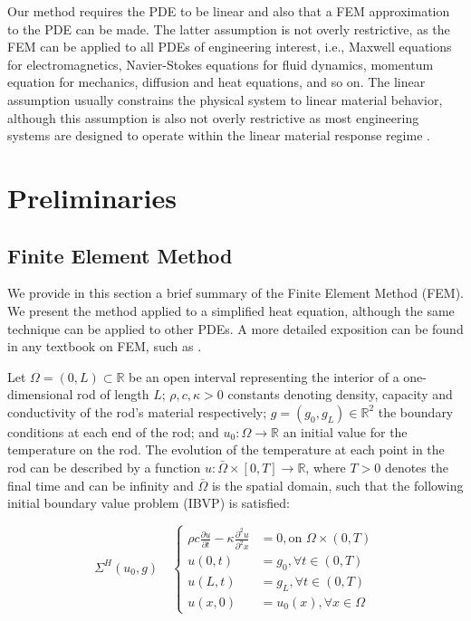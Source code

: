 \documentclass[letterpaper, 10 pt, conference]{ieeeconf/ieeeconf}
\newcommand*{\R}{\mathbb{R}}
\begin{document}
Our method requires the PDE to be linear and also that a FEM approximation to
the PDE can be made. The
latter assumption is not overly restrictive, as the FEM can be applied to all PDEs 
of engineering interest, i.e., Maxwell equations for electromagnetics,
Navier-Stokes equations for fluid dynamics, momentum equation for mechanics,
diffusion and heat equations, and so on. The linear assumption usually constrains the
physical system to linear material behavior, although this assumption is also
not overly restrictive as most engineering systems are designed to operate
within the linear material response regime \cite{}.

\section{Preliminaries}
\label{sec:preliminaries}

\subsection{Finite Element Method}
\label{sec:heat_equation_and_finite_element_analysis}

We provide in this section a brief summary of the Finite Element Method (FEM).
We present the method applied
to a simplified heat equation, although the same technique can be applied to other
PDEs. A more detailed exposition can be found in any
textbook on FEM, such as \cite{hughes_finite_2000}.

Let $\Omega = (0, L) \subset \R$ be an open interval representing the interior
of a one-dimensional rod of length $L$; $\rho, c, \kappa > 0$ 
constants denoting density, capacity and conductivity of the rod's material respectively;
$g = (g_0, g_L) \in \R^2$ the boundary conditions at each end of the rod; and $u_0 :
\Omega \rightarrow \R$ an initial value for the temperature on the rod. 
The evolution of the temperature at
each point in the rod can be described by a function $u : \bar \Omega \times [0,
T] \rightarrow \R$, where $T > 0$ denotes the final time and can be infinity and
$\bar \Omega$ is the spatial domain, such that the following initial boundary
value problem (IBVP) is satisfied:

\begin{equation}\label{eq:pde}
    \Sigma^{H}(u_0, g) \quad \left \{
    \begin{aligned}
        \rho c \frac{\partial u}{\partial t} - \kappa \frac{\partial^2
        u}{\partial^2 x} &= 0, \text{on } \Omega \times (0, T) \\
        u(0, t) &= g_0, \forall t \in (0, T) \\
        u(L, t) &= g_L, \forall t \in (0, T) \\
        u(x, 0) &= u_0(x), \forall x \in \Omega
    \end{aligned}
    \right.
\end{equation}
\end{document}
